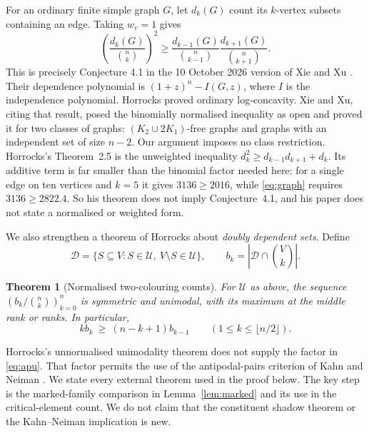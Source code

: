 \documentclass[11pt,a4paper]{article}
\newtheorem{theorem}{Theorem}[section]
\theoremstyle{remark}
\newcommand{\U}{\mathcal U}
\newcommand{\D}{\mathcal D}
\begin{document}
For an ordinary finite simple graph $G$, let $d_k(G)$ count its $k$-vertex subsets containing an edge. Taking $w_v=1$ gives
\begin{equation}\label{eq:graph}
\left(\frac{d_k(G)}{\binom nk}\right)^2\geq
\frac{d_{k-1}(G)}{\binom n{k-1}}
\frac{d_{k+1}(G)}{\binom n{k+1}}.
\end{equation}
This is precisely Conjecture 4.1 in the 10 October 2026 version of Xie and Xu \cite{XX}. Their dependence polynomial is $(1+z)^n-I(G,z)$, where $I$ is the independence polynomial. Horrocks \cite{H02} proved ordinary log-concavity. Xie and Xu, citing that result, posed the binomially normalised inequality as open and proved it for two classes of graphs: $(K_2\cup2K_1)$-free graphs and graphs with an independent set of size $n-2$. Our argument imposes no class restriction. Horrocks's Theorem~2.5 is the unweighted inequality $d_k^2\geq d_{k-1}d_{k+1}+d_k$. Its additive term is far smaller than the binomial factor needed here: for a single edge on ten vertices and $k=5$ it gives $3136\geq2016$, while \eqref{eq:graph} requires $3136\geq2822.4$. So his theorem does not imply Conjecture~4.1, and his paper does not state a normalised or weighted form.

We also strengthen a theorem of Horrocks \cite{H00} about \emph{doubly dependent sets}. Define
\[
\D=\{S\subseteq V:S\in\U,\ V\setminus S\in\U\},
\qquad b_k=|\D\cap\binom Vk|.
\]
\begin{theorem}[Normalised two-colouring counts]\label{thm:apu}
For $\U$ as above, the sequence $(b_k/\binom nk)_{k=0}^n$ is symmetric and unimodal, with its maximum at the middle rank or ranks. In particular,
\begin{equation}\label{eq:apu}
k b_k\ \geq\ (n-k+1)b_{k-1}
\qquad (1\leq k\leq\lfloor n/2\rfloor).
\end{equation}
\end{theorem}

Horrocks's unnormalised unimodality theorem does not supply the factor in \eqref{eq:apu}. That factor permits the use of the antipodal-pairs criterion of Kahn and Neiman \cite{KN}. We state every external theorem used in the proof below. The key step is the marked-family comparison in Lemma~\ref{lem:marked} and its use in the critical-element count. We do not claim that the constituent shadow theorem or the Kahn--Neiman implication is new.
\end{document}
